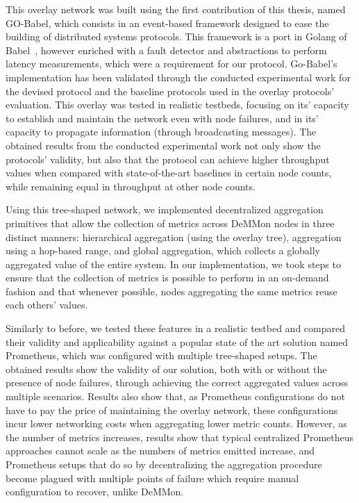 This overlay network was built using the first contribution of this thesis, named GO-Babel, which consists in an event-based framework designed to ease the building of distributed systems protocols. This framework is a port in Golang of Babel~\cite{babel}, however enriched with a fault detector and abstractions to perform latency measurements, which were a requirement for our protocol. Go-Babel's implementation has been validated through the conducted experimental work for the devised protocol and the baseline protocols used in the overlay protocols' evaluation. This overlay was tested in realistic testbeds, focusing on its’ capacity to establish and maintain the network even with node failures, and in its' capacity to propagate information (through broadcasting messages). The obtained results from the conducted experimental work not only show the protocols' validity, but also that the protocol can achieve higher throughput values when compared with state-of-the-art baselines in certain node counts, while remaining equal in throughput at other node counts.

Using this tree-shaped network, we implemented decentralized aggregation primitives that allow the collection of metrics across DeMMon nodes in three distinct manners: hierarchical aggregation (using the overlay tree), aggregation using a hop-based range, and global aggregation, which collects a globally aggregated value of the entire system. In our implementation, we took steps to ensure that the collection of metrics is possible to perform in an on-demand fashion and that whenever possible, nodes aggregating the same metrics reuse each others' values.

Similarly to before, we tested these features in a realistic testbed and compared their validity and applicability against a popular state of the art solution named Prometheus, which was configured with multiple tree-shaped setups. The obtained results show the validity of our solution, both with or without the presence of node failures, through achieving the correct aggregated values across multiple scenarios. Results also show that, as Prometheus configurations do not have to pay the price of maintaining the overlay network, these configurations incur lower networking costs when aggregating lower metric counts. However, as the number of metrics increases, results show that typical centralized Prometheus approaches cannot scale as the numbers of metrics emitted increase, and Prometheus setups that do so by decentralizing the aggregation procedure become plagued with multiple points of failure which require manual configuration to recover, unlike DeMMon. 

